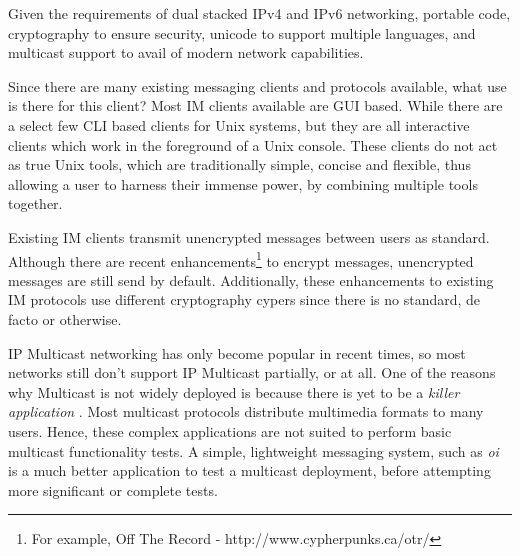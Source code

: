 
Given the requirements of dual stacked IPv4 and IPv6 networking,
portable code, cryptography to ensure security, unicode to support
multiple languages, and multicast support to avail of modern network
capabilities.


Since there are many existing messaging clients and protocols available,
what use is there for this client? Most IM clients available are GUI
based. While there are a select few CLI based clients for Unix systems,
but they are all interactive clients which work in the foreground of a
Unix console. These clients do not act as true Unix tools, which are
traditionally simple, concise and flexible, thus allowing a user to
harness their immense power, by combining multiple tools together.


Existing IM clients transmit unencrypted messages between users as
standard. Although there are 
recent enhancements\footnote{For example, Off The Record - http://www.cypherpunks.ca/otr/}
to encrypt messages, unencrypted messages are still send by default.
Additionally, these enhancements to existing IM protocols use different
cryptography cypers since there is no standard, de facto or otherwise.


IP Multicast networking has only become popular in recent times, so most
networks still don't support IP Multicast partially, or at all. One of
the reasons why Multicast is not widely deployed is because there is yet
to be a \emph{killer application} . Most multicast protocols distribute
multimedia formats to many users. Hence, these complex applications 
are not suited to perform basic multicast functionality tests. A simple,
lightweight messaging system, such as \emph{oi} is a much better  
application to test a multicast deployment, before attempting more
significant or complete tests.
